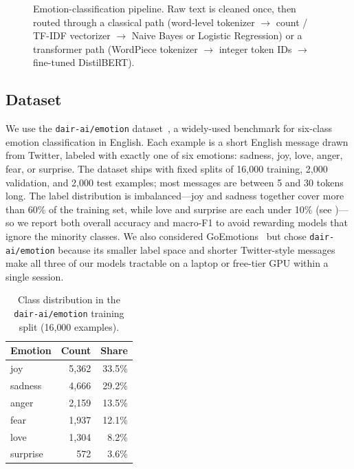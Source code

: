 \documentclass{article}
\theoremstyle{plain}
\begin{document}
\begin{figure}[t]
{}
  \caption{Emotion-classification pipeline. Raw text is cleaned once, then
    routed through a classical path (word-level tokenizer $\rightarrow$
    count / TF-IDF vectorizer $\rightarrow$ Naive Bayes or Logistic
    Regression) or a transformer path (WordPiece tokenizer $\rightarrow$
    integer token IDs $\rightarrow$ fine-tuned DistilBERT).}
  \label{fig:pipeline}
\end{figure}

\subsection{Dataset}
\label{sec:data}

We use the \texttt{dair-ai/emotion} dataset~\cite{saravia2018carer}, a
widely-used benchmark for six-class emotion classification in English. Each
example is a short English message drawn from Twitter, labeled with
exactly one of six emotions: sadness, joy, love, anger, fear, or surprise.
The dataset ships with fixed splits of 16{,}000 training, 2{,}000
validation, and 2{,}000 test examples; most messages are between 5 and 30
tokens long. The label distribution is imbalanced---joy and sadness
together cover more than 60\% of the training set, while love and surprise
are each under 10\% (see )---so we report both overall
accuracy and macro-F1 to avoid rewarding models that ignore the minority
classes. We also considered
GoEmotions~\cite{demszky2020goemotions} but chose
\texttt{dair-ai/emotion} because its smaller label space and shorter
Twitter-style messages make all three of our models tractable on a laptop
or free-tier GPU within a single session.

\begin{table}[t]
  \centering
  \small
  \caption{Class distribution in the \texttt{dair-ai/emotion} training split
    (16{,}000 examples).}
  \label{tab:class-dist}
  \begin{tabular}{lrr}
    \toprule
    Emotion   & Count  & Share \\
    \midrule
    joy       & 5{,}362 & 33.5\% \\
    sadness   & 4{,}666 & 29.2\% \\
    anger     & 2{,}159 & 13.5\% \\
    fear      & 1{,}937 & 12.1\% \\
    love      & 1{,}304 & 8.2\%  \\
    surprise  &   572   & 3.6\%  \\
    \bottomrule
  \end{tabular}
\end{table}
\end{document}
